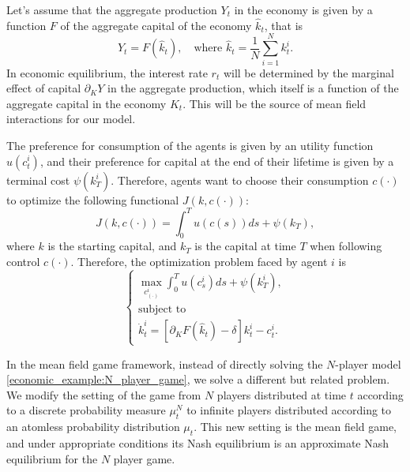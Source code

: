 \documentclass{article}
\begin{document}
Let's assume that the aggregate production $Y_t$ in the economy is given by a function $F$ of the aggregate capital of the economy $\hat k_t$, that is
\begin{equation}
    Y_t = F(\hat k_t),\quad \text{where } \hat k_t = \frac{1}{N} \sum_{i = 1}^N k_t^i.
\end{equation}
In economic equilibrium, the interest rate $r_t$ will be determined by the marginal effect of capital $\partial_K Y$ in the aggregate production,
which itself is a function of the aggregate capital in the economy $K_t$. This will be the source of mean field interactions for our model.

The preference for consumption of the agents is given by an utility function $u(c_t^i)$, 
and their preference for capital at the end of their lifetime is given by a terminal cost $\psi(k_T^i)$.
Therefore, agents want to choose their consumption $c(\cdot)$ to optimize the following functional $J(k, c(\cdot))$:
\begin{equation}
    J(k, c(\cdot)) = \int_0^T u(c(s)) ds + \psi(k_T),
\end{equation}
where $k$ is the starting capital, and $k_T$ is the capital at time $T$ when following control $c(\cdot)$.
Therefore, the optimization problem faced by agent $i$ is
\begin{equation}\label{economic_example:N_player_game}
    \begin{cases}
        \max_{c^i_{(\cdot)}} \int_0^T u(c^i_s) ds + \psi(k^i_T),\\
        \text{subject to}\\
        \dot k_t^i = \left[ \partial_K F(\hat k_t) - \delta \right] k_t^i - c_t^i.
    \end{cases}
\end{equation}

In the mean field game framework, instead of directly solving the $N$-player model \eqref{economic_example:N_player_game},
we solve a different but related problem. 
We modify the setting of the game from $N$ players distributed at time $t$ according to a discrete probability measure $\mu^N_t$ to infinite players
distributed according to an atomless probability distribution  $\mu_t$.
This new setting is the mean field game, and under appropriate conditions its Nash equilibrium is an approximate Nash equilibrium for the $N$ player game.
\end{document}
